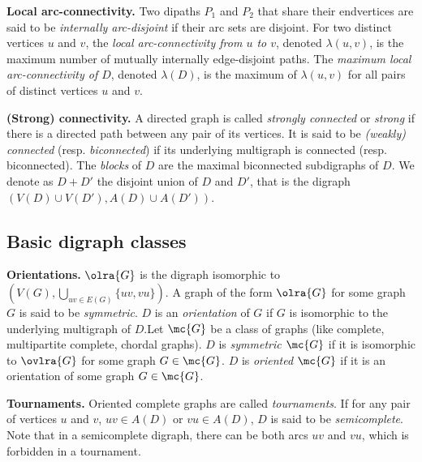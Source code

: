 \medskip

\textbf{Local arc-connectivity.}
Two dipaths $P_1$ and $P_2$ that share their endvertices are said to be \emph{internally arc-disjoint} if their arc sets are disjoint.
For two distinct vertices $u$ and $v$, the \emph{local arc-connectivity from $u$ to $v$}, denoted $\lambda(u,v)$, is the maximum number of mutually internally edge-disjoint paths. The \emph{maximum local arc-connectivity of $D$}, denoted $\lambda(D)$, is the maximum of $\lambda(u,v)$ for all pairs of distinct vertices $u$ and $v$.


\medskip

\textbf{(Strong) connectivity.}
A directed graph is called \emph{strongly connected} or \emph{strong} if there is a directed path between any pair of its vertices. It is said to be \emph{(weakly) connected} (resp. \emph{biconnected}) if its underlying multigraph is connected (resp. biconnected). The \emph{blocks} of $D$ are the maximal biconnected subdigraphs of $D$. We denote as $D + D'$ the disjoint union of $D$ and $D'$, that is the digraph $(V(D) \cup V(D'), A(D) \cup A(D'))$.

\subsection{Basic digraph classes}


\textbf{Orientations.}
$\olra{G}$ is the digraph isomorphic to $(V(G), \bigcup_{uv \in E(G)} \{uv, vu\})$. A graph of the form $\olra{G}$ for some graph $G$ is said to be \emph{symmetric}. $D$ is an \emph{orientation} of $G$ if $G$ is isomorphic to the underlying multigraph of $D$.Let $\mc{G}$ be a class of graphs (like complete, multipartite complete, chordal graphs).  $D$ is {\em symmetric $\mc{G}$} if it is isomorphic to $\ovlra{G}$ for some graph $G \in \mc{G}$. $D$ is {\em oriented $\mc{G}$} if it is an orientation of some graph $G \in \mc{G}$.

\medskip

\textbf{Tournaments.}
Oriented complete graphs are called \emph{tournaments}. If for any pair of vertices $u$ and $v$, $uv \in A(D)$ or $vu \in A(D)$, $D$ is said to be \emph{semicomplete}. Note that in a semicomplete digraph, there can be both arcs $uv$ and $vu$, which is forbidden in a tournament.

\medskip

